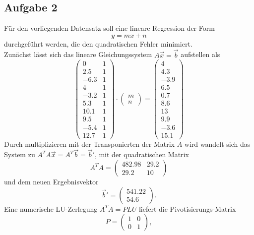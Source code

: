 \documentclass{scrartcl}
\begin{document}
\newpage
\subsection*{Aufgabe 2}
\begin{table}[h]
    \centering

\end{table}
\noindent Für den vorliegenden Datensatz soll eine lineare Regression der Form
\[
y = mx + n
\]
durchgeführt werden, die den quadratischen Fehler minimiert.\\
Zunächst lässt sich das lineare Gleichungssystem $A\vec{x}=\vec{b}$ aufstellen als
\[
\begin{pmatrix}
   0  & 1\\
 2.5  & 1\\
-6.3  & 1\\
   4  & 1\\ 
-3.2  & 1\\
 5.3  & 1\\
10.1  & 1\\
 9.5  & 1\\
-5.4  & 1\\
12.7  & 1
\end{pmatrix}\cdot
\begin{pmatrix}
m\\
n
\end{pmatrix} = 
\begin{pmatrix}
4\\
4.3\\
-3.9\\
6.5\\
0.7\\
8.6\\
13\\
9.9\\
-3.6\\
15.1
\end{pmatrix}
\]
Durch multiplizieren mit der Transponierten der Matrix $A$ wird wandelt sich das
System zu $A^TA\vec{x} = A^T \vec{b} = \vec{b}'$, mit der quadratischen Matrix
\[
A^TA = \begin{pmatrix}
482.98 & 29.2 \\
  29.2  &  10 
\end{pmatrix}
\]
und dem neuen Ergebnisvektor
\[
\vec{b}' = \begin{pmatrix}
541.22\\
  54.6
\end{pmatrix}\text{.}
\]
Eine numerische LU-Zerlegung $A^TA = PLU$ liefert die Pivotisierungs-Matrix
\[
P = 
\begin{pmatrix}
1 & 0\\
0 & 1
\end{pmatrix},
\]
\end{document}
